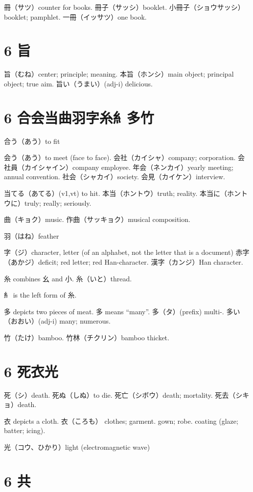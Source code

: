冊（サツ）counter for books.
冊子（サッシ）booklet.
小冊子（ショウサッシ）booklet; pamphlet.
一冊（イッサツ）one book.

\section{6 旨}

旨（むね）center; principle; meaning.
本旨（ホンシ）main object; principal object; true aim.
旨い（うまい）(adj-i) delicious.

\section{6 合会当曲羽字糸糹多竹}

合う（あう）to fit

会う（あう）to meet (face to face).
会社（カイシャ）company; corporation.
会社員（カイシャイン）company employee.
年会（ネンカイ）yearly meeting; annual convention.
社会（シャカイ）society.
会見（カイケン）interview.

当てる（あてる）(v1,vt) to hit.
本当（ホントウ）truth; reality.
本当に（ホントウに）truly; really; seriously.

曲（キョク）music.
作曲（サッキョク）musical composition.

羽（はね）feather

字（ジ）character, letter (of an alphabet, not the letter that is a document)
赤字（あかジ）deficit; red letter; red Han-character.
漢字（カンジ）Han character.

糸 combines 幺 and 小.
糸（いと）thread.

糹 is the left form of 糸.

多 depicts two pieces of meat.
多 means ``many''.
多（タ）(prefix) multi-.
多い（おおい）(adj-i) many; numerous.

竹（たけ）bamboo.
竹林（チクリン）bamboo thicket.

\section{6 死衣光}

死（シ）death.
死ぬ（しぬ）to die.
死亡（シボウ）death; mortality.
死去（シキョ）death.

衣 depicts a cloth.
衣（ころも）
clothes;
garment. gown;
robe. coating (glaze; batter; icing).

光（コウ、ひかり）light (electromagnetic wave)

\section{6 共}

